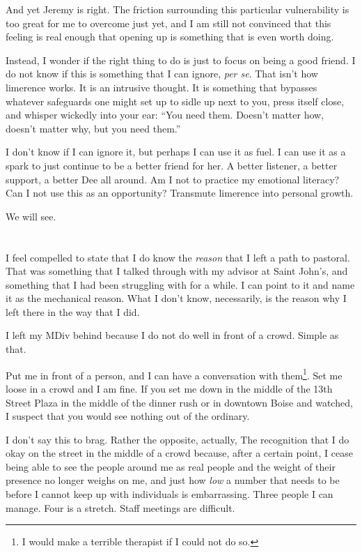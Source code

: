 And yet Jeremy is right. The friction surrounding this particular vulnerability is too great for me to overcome just yet, and I am still not convinced that this feeling is real enough that opening up is something that is even worth doing.

Instead, I wonder if the right thing to do is just to focus on being a good friend. I do not know if this is something that I can ignore, \emph{per se}. That isn't how limerence works. It is an intrusive thought. It is something that bypasses whatever safeguards one might set up to sidle up next to you, press itself close, and whisper wickedly into your ear: ``You need them. Doesn't matter how, doesn't matter why, but you need them.''

I don't know if I can ignore it, but perhaps I can use it as fuel. I can use it as a spark to just continue to be a better friend for her. A better listener, a better support, a better Dee all around. Am I not to practice my emotional literacy? Can I not use this as an opportunity? Transmute limerence into personal growth.

We will see.

\section{}

I feel compelled to state that I do know the \emph{reason} that I left a path to pastoral. That was something that I talked through with my advisor at Saint John's, and something that I had been struggling with for a while. I can point to it and name it as the mechanical reason. What I don't know, necessarily, is the reason why I left there in the way that I did.

I left my MDiv behind because I do not do well in front of a crowd. Simple as that.

Put me in front of a person, and I can have a conversation with them\footnote{I would make a terrible therapist if I could not do so.}. Set me loose in a crowd and I am fine. If you set me down in the middle of the 13th Street Plaza in the middle of the dinner rush or in downtown Boise and watched, I suspect that you would see nothing out of the ordinary.

I don't say this to brag. Rather the opposite, actually, The recognition that I do okay on the street in the middle of a crowd because, after a certain point, I cease being able to see the people around me as real people and the weight of their presence no longer weighs on me, and just how \emph{low} a number that needs to be before I cannot keep up with individuals is embarrassing. Three people I can manage. Four is a stretch. Staff meetings are difficult.

